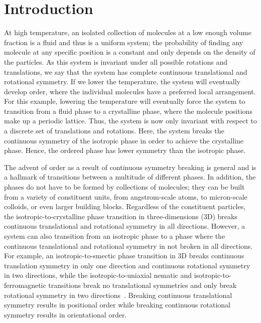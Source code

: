\chapter{Introduction}\label{c:1}
At high temperature, an isolated collection of molecules at a low enough volume fraction is a fluid and thus is a uniform system; the probability of finding any molecule at any specific position is a constant and only depends on the density of the particles.
As this system is invariant under all possible rotations and translations, we say that the system has complete continuous translational and rotational symmetry.
If we lower the temperature, the system will eventually develop order, where the individual molecules have a preferred local arrangement.
For this example, lowering the temperature will eventually force the system to transition from a fluid phase to a crystalline phase, where the molecule positions make up a periodic lattice.
Thus, the system is now only invariant with respect to a discrete set of translations and rotations.
Here, the system breaks the continuous symmetry of the isotropic phase in order to achieve the crystalline phase.
Hence, the ordered phase has lower symmetry than the isotropic phase.

The advent of order as a result of continuous symmetry breaking is general and is a hallmark of transitions between a multitude of different phases.
In addition, the phases do not have to be formed by collections of molecules; they can be built from a variety of constituent units, from angstrom-scale atoms, to micron-scale colloids, or even larger building blocks.
Regardless of the constituent particles, the isotropic-to-crystalline phase transition in three-dimensions (3D) breaks continuous translational and rotational symmetry in all directions.
However, a system can also transition from an isotropic phase to a phase where the continuous translational and rotational symmetry in not broken in all directions.
For example, an isotropic-to-smectic phase transition in 3D breaks continuous translation symmetry in only one direction and continuous rotational symmetry in two directions, while the isotropic-to-uniaxial nematic and isotropic-to-ferromagnetic transitions break no translational symmetries and only break rotational symmetry in two directions~\cite{RN175}.
Breaking continuous translational symmetry results in positional order while breaking continuous rotational symmetry results in orientational order.

